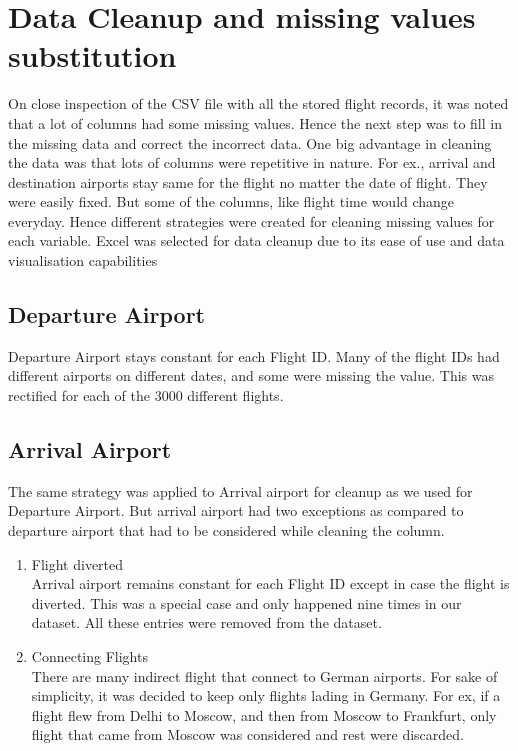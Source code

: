 \section{Data Cleanup and missing values substitution}
On close inspection of the CSV file with all the stored flight records, it was noted that a lot of columns had some missing values. Hence the next step was to fill in the missing data and correct the incorrect data. One big advantage in cleaning the data was that lots of columns were repetitive in nature. For ex., arrival and destination airports stay same for the flight no matter the date of flight. They were easily fixed. But some of the columns, like flight time would change everyday. Hence different strategies were created for cleaning missing values for each variable.
Excel was selected for data cleanup due to its ease of use and data visualisation capabilities

\subsection{Departure Airport}
Departure Airport stays constant for each Flight ID. Many of the flight IDs had different airports on different dates, and some were missing the value. This was rectified for each of the 3000 different flights.

\subsection{Arrival Airport}
The same strategy was applied to Arrival airport for cleanup as we used for Departure Airport. But arrival airport had two exceptions as compared to departure airport that had to be considered while cleaning the column.
\begin{enumerate}
    \item Flight diverted
    \\Arrival airport remains constant for each Flight ID except in case the flight is diverted. This was a special case and only happened nine times in our dataset. All these entries were removed from the dataset.
    \item Connecting Flights
    \\There are many indirect flight that connect to German airports. For sake of simplicity, it was decided to keep only flights lading in Germany. For ex, if a flight flew from Delhi to Moscow, and then from Moscow to Frankfurt, only flight that came from Moscow was considered and rest were discarded. 
\end{enumerate} 

